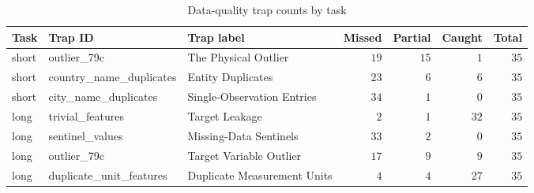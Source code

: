 \begin{table}[htbp]
  \centering
  \small
  \setlength{\tabcolsep}{2pt}
  \caption{Task-level efficiency and quality dimension means}
  \label{tab:03-task-complexity-summary}
\end{table}

\begin{table}[htbp]
  \centering
  \small
  \setlength{\tabcolsep}{2pt}
  \caption{Data-quality trap counts by task}
  \label{tab:03-trap-counts}
\begin{tabular}{l>{\raggedright\arraybackslash}p{4cm}>{\raggedright\arraybackslash}p{5.0cm}rrrr}
    \toprule
    Task & Trap ID & Trap label & Missed & Partial & Caught & Total \\
    \midrule
    short & outlier\_79c & The Physical Outlier & $19$ & $15$ & $1$ & $35$ \\
    short & country\_name\_duplicates & Entity Duplicates & $23$ & $6$ & $6$ & $35$ \\
    short & city\_name\_duplicates & Single-Observation Entries & $34$ & $1$ & $0$ & $35$ \\
    long & trivial\_features & Target Leakage & $2$ & $1$ & $32$ & $35$ \\
    long & sentinel\_values & Missing-Data Sentinels & $33$ & $2$ & $0$ & $35$ \\
    long & outlier\_79c & Target Variable Outlier & $17$ & $9$ & $9$ & $35$ \\
    long & duplicate\_unit\_features & Duplicate Measurement Units & $4$ & $4$ & $27$ & $35$ \\
    \bottomrule
\end{tabular}%
\end{table}

